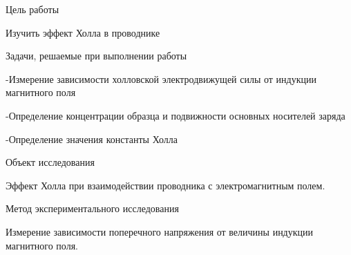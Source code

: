 \documentclass[12pt]{article}
\begin{document}
    \makeheader

    \begin{point}{Цель работы}
        \par Изучить эффект Холла в проводнике
    \end{point}

    \begin{point}{Задачи, решаемые при выполнении работы}
        \par -Измерение зависимости холловской электродвижущей силы от индукции магнитного поля
        \par -Определение концентрации образца и подвижности основных носителей заряда
        \par -Определение значения константы Холла
    \end{point}

    \begin{point}{Объект исследования}
        \par Эффект Холла при взаимодействии проводника с электромагнитным полем.
    \end{point}

    \begin{point}{Метод экспериментального исследования}
        \par Измерение зависимости поперечного напряжения от величины индукции магнитного поля.
    \end{point}
\end{document}
